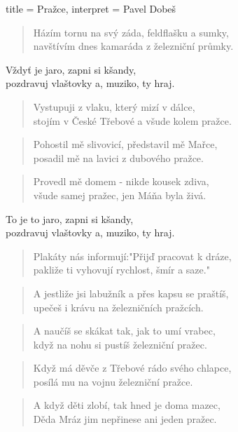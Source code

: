 \begin{song}{
title = {Pražce}, 
interpret = {Pavel Dobeš}
}
\begin{verse}
Házím tornu na svý záda, feldflašku a sumky, \\
navštívím dnes kamaráda z železniční průmky.
\end{verse}

\begin{chorus}
Vždyť je jaro, zapni si kšandy, \\
pozdravuj vlaštovky a, muziko, ty hraj.
\end{chorus}
\begin{verse}
Vystupuji z vlaku, který mizí v dálce, \\
stojím v České Třebové a všude kolem pražce.
\end{verse}

\begin{verse}
Pohostil mě slivovicí, představil mě Mařce, \\
posadil mě na lavici z dubového pražce.
\end{verse}
\begin{verse}
Provedl mě domem - nikde kousek zdiva, \\
všude samej pražec, jen Máňa byla živá.
\end{verse}
\begin{chorus}
To je to jaro, zapni si kšandy, \\
pozdravuj vlaštovky a, muziko, ty hraj.
\end{chorus}
\begin{verse}
Plakáty nás informují:"Přijď pracovat k dráze, \\
pakliže ti vyhovují rychlost, šmír a saze."
\end{verse}
\begin{verse}
A jestliže jsi labužník a přes kapsu se praštíš, \\
upečeš i krávu na železničních pražcích.
\end{verse}
\begin{verse}
A naučíš se skákat tak, jak to umí vrabec, \\
když na nohu si pustíš železniční pražec.
\end{verse}
\begin{verse}
Když má děvče z Třebové rádo svého chlapce, \\
posílá mu na vojnu železniční pražce.
\end{verse}
\begin{verse}
A když děti zlobí, tak hned je doma mazec, \\
Děda Mráz jim nepřinese ani jeden pražec.
\end{verse}


\end{song}

